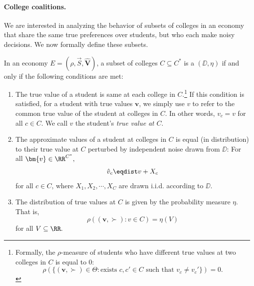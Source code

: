 \documentclass[10pt]{article}
\begin{document}
\begin{ReviewVerbatim}
\paragraph{College coalitions.}
We are interested in analyzing the behavior of subsets of colleges in an economy that share the same true preferences over students, but who each make noisy decisions. We now formally define these subsets.

In an economy $E=(\rho, \vec{S}, \hat{\bm{V}})$, a subset of colleges $C\subseteq {C^*}$ is a $(\DD,\eta)$ if and only if the following conditions are met:
\begin{enumerate}
    \item The true value of a student is same at each college in $C$.\footnote{Formally, the $\rho$-measure of students who have different true values at two colleges in $C$ is equal to $0$:
    \begin{equation}
        \rho\left(\{(\bm{v}, \succ) \in \Theta: \text{exists }c,c'\in C\text{ such that }v_c\neq v_c'\}\right) = 0.
    \end{equation}
    }
    If this condition is satisfied, for a student with true values $\bm{v}$, we simply use $v$ to refer to the common true value of the student at colleges in $C$. In other words, $v_c=v$ for all $c\in C$. We call $v$ the student's \textit{true value at $C$}.
    \item The approximate values of a student at colleges in $C$ is equal (in distribution) to their true value at $C$ perturbed by independent noise drawn from $\DD$: For all $\bm{v}\in \RR^{C^*},$
    \begin{equation}
        \hat{v}_c \eqdist v + X_c
    \end{equation}
    for all $c\in C$,
    where $X_1, X_2, \cdots, X_C$ are drawn i.i.d. according to $\DD$.
    \item The distribution of true values at $C$ is given by the probability measure $\eta$. That is,
    \begin{equation}
        \rho((\bm{v},\succ): v\in C) = \eta(V)
    \end{equation}
    for all $V\subseteq \RR.$
\end{enumerate}


\end{ReviewVerbatim}
\end{document}
